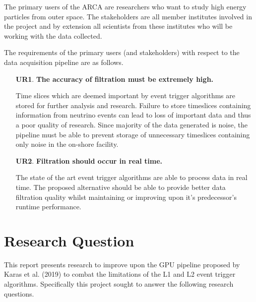 The primary users of the ARCA are researchers who want to study high energy
particles from outer space. The stakeholders are all member institutes involved
in the project and by extension all scientists from these institutes who will
be working with the data collected.

The requirements of the primary users (and stakeholders) with respect to the
data acquisition pipeline are as follows.

\begin{enumerate}
  \item[\textbf{UR1}.]\textbf{The accuracy of filtration must be extremely high.}

    Time slices which are deemed important by event trigger algorithms
    are stored for further analysis and research. Failure to store
    timeslices containing information from neutrino events can lead to
    loss of important data and thus a poor quality of research. Since
    majority of the data generated is noise, the pipeline must be able
    to prevent storage of unnecessary timeslices containing only noise
    in the on-shore facility.

  \item[\textbf{UR2}.] \textbf{Filtration should occur in real time.}

    The state of the art event trigger algorithms are able to process
    data in real time. The proposed alternative should be able to
    provide better data filtration quality whilst maintaining or
    improving upon it's predecessor's runtime performance.

\end{enumerate}

\section{Research Question}
\label{sec:rqs}

This report presents research to improve upon the GPU pipeline
proposed by Karas et al. (2019) to combat the limitations of the L1
and L2 event trigger algorithms. Specifically this project sought to
answer the following research questions.

